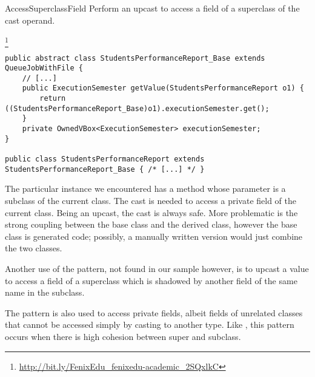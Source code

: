 \begin{pattern}{AccessSuperclassField}
Perform an upcast to access a field of a superclass of the cast operand.

\instances{}
\footnote{\url{http://bit.ly/FenixEdu_fenixedu-academic_2SQxlkC}}

\begin{verbatim}
public abstract class StudentsPerformanceReport_Base extends QueueJobWithFile {
    // [...]
    public ExecutionSemester getValue(StudentsPerformanceReport o1) {
        return ((StudentsPerformanceReport_Base)o1).executionSemester.get();
    }
    private OwnedVBox<ExecutionSemester> executionSemester;
}
 
public class StudentsPerformanceReport extends StudentsPerformanceReport_Base { /* [...] */ }
\end{verbatim}

\discussion{}
The particular instance we encountered has a method whose parameter is a
  subclass of the current class. The cast is needed to access a private
  field of the current class.
  Being an upcast, the cast is always safe. More problematic is the strong coupling 
  between the base class and the derived class, however the base class is
  generated code; possibly, a manually written version would just combine the
  two classes.

  Another use of the pattern, not found in our sample however,
  is to upcast a value to access a field of a superclass 
  which is shadowed by another field of the same name in the subclass.

  The  pattern is also used to access
  private fields, albeit fields of unrelated classes that cannot be accessed
  simply by casting to another type.
  Like , this pattern occurs
  when there is high cohesion between super and subclass.

\end{pattern}
